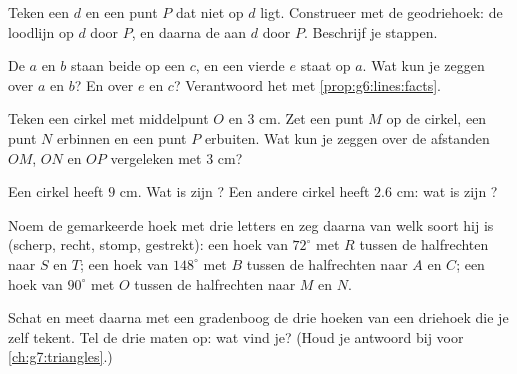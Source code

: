 \begin{exercise}[$\star$]\label{exo:g6:lines:3}
Teken een  $d$ en een punt $P$ dat niet op $d$ ligt. Construeer met de
geodriehoek: de loodlijn op $d$ door $P$, en daarna de  aan $d$ door
$P$. Beschrijf je stappen.
\end{exercise}

\begin{exercise}[$\star$]\label{exo:g6:lines:4}
De  $a$ en $b$ staan beide  op een  $c$, en een vierde 
$e$ staat  op $a$. Wat kun je zeggen over $a$ en $b$? En over $e$ en
$c$? Verantwoord het met \cref{prop:g6:lines:facts}.
\end{exercise}

\begin{exercise}[$\star$]\label{exo:g6:lines:5}
Teken een cirkel met middelpunt $O$ en  $3$ cm. Zet een punt $M$ op de
cirkel, een punt $N$ erbinnen en een punt $P$ erbuiten. Wat kun je zeggen over
de afstanden $OM$, $ON$ en $OP$ vergeleken met $3$ cm?
\end{exercise}

\begin{exercise}[$\star$]\label{exo:g6:lines:6}
Een cirkel heeft  $9$ cm. Wat is zijn ? Een andere cirkel heeft
 $2.6$ cm: wat is zijn ?
\end{exercise}

\begin{exercise}[$\star$]\label{exo:g6:lines:7}
Noem de gemarkeerde hoek met drie letters en zeg daarna van welk soort hij is
(scherp, recht, stomp, gestrekt): een hoek van $72^\circ$ met  $R$
tussen de halfrechten naar $S$ en $T$; een hoek van $148^\circ$ met 
$B$ tussen de halfrechten naar $A$ en $C$; een hoek van $90^\circ$ met
 $O$ tussen de halfrechten naar $M$ en $N$.
\end{exercise}

\begin{exercise}[$\star$]\label{exo:g6:lines:8}
Schat en meet daarna met een gradenboog de drie hoeken van een driehoek die je
zelf tekent. Tel de drie maten op: wat vind je? (Houd je antwoord bij voor
\cref{ch:g7:triangles}.)
\end{exercise}

